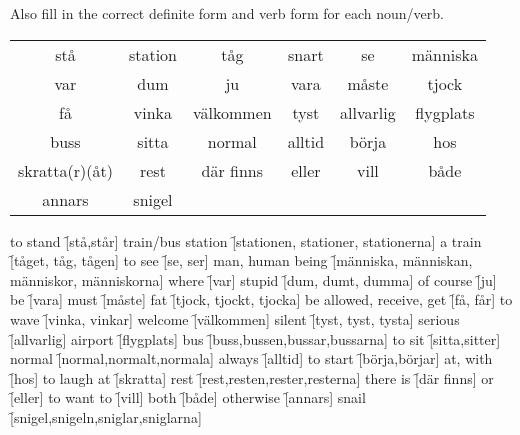 \begin{flushleft}
    Also fill in the correct definite form and verb form for each noun/verb.
\end{flushleft}
\begin{center}
    \begin{tabular}{|c c c c c c|}
        \hline
        stå & station & tåg & snart & se & människa \\
        var & dum & ju & vara & måste & tjock \\
        få & vinka & välkommen & tyst & allvarlig & flygplats \\
        buss & sitta & normal & alltid & börja & hos \\
        skratta(r)(åt) & rest & där finns & eller & vill & både \\
        annars & snigel &&&& \\
        \hline
    \end{tabular}
\end{center}

\begin{questions}
    \begin{multicols}{2}
        \raggedcolumns
        \question to stand \f[stå,står]
        \question train/bus station \f[stationen, stationer, stationerna]
        \question a train \f[tåget, tåg, tågen]
        \question to see \f[se, ser]
        \question man, human being \f[människa, människan, människor, människorna]
        \question where \f[var]
        \question stupid \f[dum, dumt, dumma]
        \question of course \f[ju]
        \question be \f[vara]
        \question must \f[måste]
        \question fat \f[tjock, tjockt, tjocka]
        \question be allowed, receive, get \f[få, får]
        \question to wave \f[vinka, vinkar]
        \question welcome \f[välkommen]
        \question silent \f[tyst, tyst, tysta]
        \question serious \f[allvarlig]
        \question airport \f[flygplats]
        \question bus \f[buss,bussen,bussar,bussarna]
        \question to sit \f[sitta,sitter]
        \question normal \f[normal,normalt,normala]
        \question always \f[alltid]
        \question to start \f[börja,börjar]
        \question at, with \f[hos]
        \question to laugh at \f[skratta]
        \question rest \f[rest,resten,rester,resterna]
        \question there is \f[där finns]
        \question or \f[eller]
        \question to want to \f[vill]
        \question both \f[både]
        \question otherwise \f[annars]
        \question snail \f[snigel,snigeln,sniglar,sniglarna]
    \end{multicols}
\end{questions}
